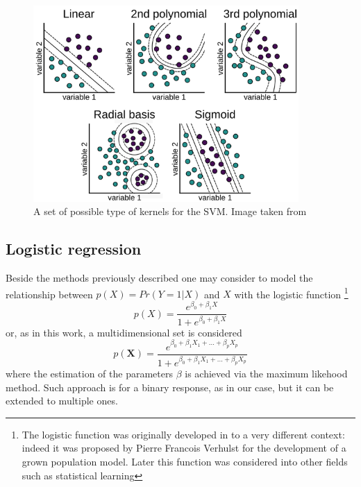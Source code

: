 \documentclass[
12pt, %
a4paper, %
oneside, %
headinclude,footinclude, %
BCOR5mm, %
]{scrartcl}
\begin{document}
\begin{figure}[h]
\begin{center}
\includegraphics[width=0.9\textwidth]{Pic/Kernels_Type.png}
\caption{A set of possible type of kernels for the SVM. Image taken from \cite{ker_svm}}
\label{SVM_kernels}
\end{center}
\end{figure}
\subsection{Logistic regression}
Beside the methods previously described one may consider to model the relationship between $p(X)=Pr(Y=1|X)$ and $X$ with the logistic function \footnote{The logistic function was originally developed in to a very different context: indeed it was proposed by Pierre Francois Verhulst \cite{verhulst1838correspondance} for the development of a grown population model. Later this function was considered into other fields such as statistical learning}  \cite{james2013introduction}
\begin{equation}
p(X)=\dfrac{e^{\beta_{0}+\beta_{1}X}}{1+e^{\beta_{0}+\beta_{1}X}}
\end{equation}
or, as in this work, a multidimensional set is considered \cite{james2013introduction}
\begin{equation}
p(\textbf{X})=\dfrac{e^{\beta_{0}+\beta_{1}X_{1}+...+\beta_{p}X_{p}}}{1+e^{\beta_{0}+\beta_{1}X_{1}+...+\beta_{p}X_{p}}}
\end{equation}
where the estimation of the parameters $\beta$ is achieved via the maximum likehood method. Such approach is for a binary response, as in our case, but it can be extended to multiple ones.
\end{document}
